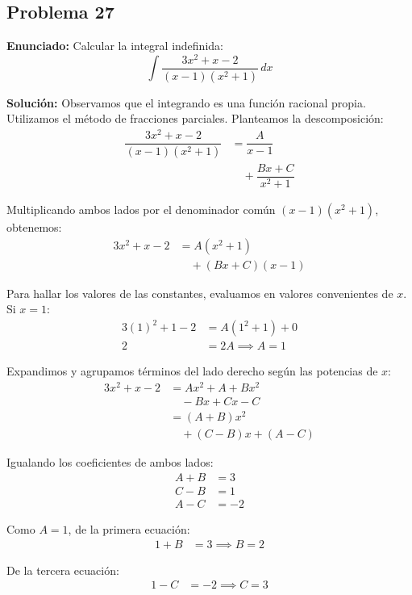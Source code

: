 \subsection*{Problema 27}

\textbf{Enunciado:}
Calcular la integral indefinida:
\begin{equation*}
\int \dfrac{3x^2 + x - 2}{(x - 1)(x^2 + 1)} \, dx
\end{equation*}

\textbf{Solución:}
Observamos que el integrando es una función racional propia. 
Utilizamos el método de fracciones parciales. 
Planteamos la descomposición:
\begin{align*}
\dfrac{3x^2 + x - 2}{(x - 1)(x^2 + 1)} &= \dfrac{A}{x - 1} \\
&\quad + \dfrac{Bx + C}{x^2 + 1}
\end{align*}

Multiplicando ambos lados por el denominador común $(x - 1)(x^2 + 1)$, obtenemos:
\begin{align*}
3x^2 + x - 2 &= A(x^2 + 1) \\
&\quad + (Bx + C)(x - 1)
\end{align*}

Para hallar los valores de las constantes, evaluamos en valores convenientes de $x$. 
Si $x = 1$:
\begin{align*}
3(1)^2 + 1 - 2 &= A(1^2 + 1) + 0 \\
2 &= 2A \implies A = 1
\end{align*}

Expandimos y agrupamos términos del lado derecho según las potencias de $x$:
\begin{align*}
3x^2 + x - 2 &= Ax^2 + A + Bx^2 \\
&\quad - Bx + Cx - C \\
&= (A + B)x^2 \\
&\quad + (C - B)x + (A - C)
\end{align*}

Igualando los coeficientes de ambos lados:
\begin{align*}
A + B &= 3 \\
C - B &= 1 \\
A - C &= -2
\end{align*}

Como $A = 1$, de la primera ecuación:
\begin{align*}
1 + B &= 3 \implies B = 2
\end{align*}

De la tercera ecuación:
\begin{align*}
1 - C &= -2 \implies C = 3
\end{align*}

